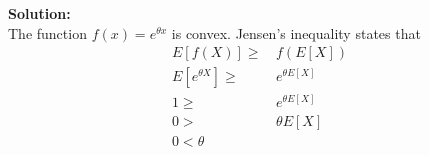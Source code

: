 \documentclass[letterpaper,12pt]{article}
\theoremstyle{definition}
\begin{document}
\begin{enumerate}
\textbf{Solution:}\\
The function $f(x) = e^{\theta x}$ is convex. Jensen's inequality states that 
\begin{align*}
E[f(X)] \geq& \, f(E[X]) \\ 
E[e^{\theta X}]\geq& \,  e^{\theta E[X]} \\
1\geq& \,  e^{\theta E[X]}\\
 0 > & \,  \theta E[X] \\
0 < \theta
\end{align*}
\end{enumerate}

\vspace{25mm}


\end{document}
